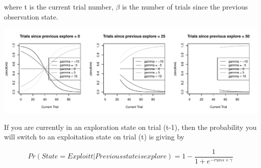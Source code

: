 \documentclass[a4paper,doc,natbib,floatsintext]{apa6}\usepackage[]{graphicx}\usepackage[]{color}
\makeatletter
\def\maxwidth{ %
  \ifdim\Gin@nat@width>\linewidth
    \linewidth
  \else
    \Gin@nat@width
  \fi
}
\newenvironment{knitrout}{}{} %
\makeatother
\begin{document}
where t is the current trial number, $\beta$ is the number of trials since the previous observation state. 

\begin{knitrout}
\color{fgcolor}
\includegraphics[width=\maxwidth]{figure/unnamed-chunk-5-1} 

\end{knitrout}


If you are currently in an exploration state on trial (t-1), then the probability you will switch to an exploitation state on trial (t) is giving by

\begin{center}
\begin{equation}
\label{eq:modeswitch2}

Pr(State=Exploit{t} | Previous state is explore)= 1-\frac{1}{1 + e^{-runs \times \gamma}}

\end{equation}
\end{center}


































\end{document}
